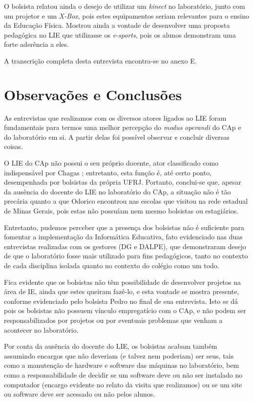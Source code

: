 O bolsista relatou ainda o desejo de utilizar um \textit{kinect} no laboratório, junto com um projetor e um \textit{X-Box}, pois estes equipamentos seriam relevantes para o ensino da Educação Física. Mostrou ainda a vontade de desenvolver uma proposta pedagógica no LIE que utilizasse os \textit{e-sports}, pois os alunos demonstram uma forte aderência a eles.

A transcrição completa desta entrevista encontra-se no anexo E.

\section{Observações e Conclusões}\label{chp:LABEL_CHP_ENT_OBS_CONC}

As entrevistas que realizamos com os diversos atores ligados ao LIE foram fundamentais para termos uma melhor percepção do \textit{modus operandi} do CAp e do laboratório em si. A partir delas foi possível observar e concluir diversas coisas.

O LIE do CAp não possui o seu próprio docente, ator classificado como indispensável por Chagas \cite{art:REF_ART_CHAGAS}; entretanto, esta função é, até certo ponto, desempenhada por bolsistas da própria UFRJ. Portanto, conclui-se que, apesar da ausência do docente do LIE no laboratório do CAp, a situação não é tão precária quanto a que Odorico \cite{art:REF_ART_ODORICO} encontrou nas escolas que visitou na rede estadual de Minas Gerais, pois estas não possuíam nem mesmo bolsistas ou estagiários.

Entretanto, pudemos perceber que a presença dos bolsistas não é suficiente para fomentar a implementação da Informática Educativa, fato evidenciado nas duas entrevistas realizadas com os gestores (DG e DALPE), que demonstraram desejo de que o laboratório fosse mais utilizado para fins pedagógicos, tanto no contexto de cada disciplina isolada quanto no contexto do colégio como um todo.

Fica evidente que os bolsistas não têm possibilidade de desenvolver projetos na área de IE, ainda que estes queiram fazê-lo, e esta vontade se mostra presente, conforme evidenciado pelo bolsista Pedro no final de sua entrevista. Isto se dá pois os bolsistas não possuem vínculo empregatício com o CAp, e não podem ser responsabilizados por projetos ou por eventuais problemas que venham a acontecer no laboratório.

Por conta da ausência do docente do LIE, os bolsistas acabam também assumindo encargos que não deveriam (e talvez nem poderiam) ser seus, tais como a manutenção de hardware e software das máquinas no laboratório, bem como a responsabilidade de decidir se um software deve ou não ser instalado no computador (encargo evidente no relato da visita que realizamos) ou se um site ou software deve ser acessado ou não pelos alunos.

